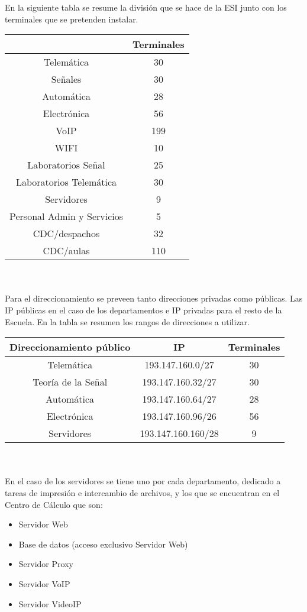 \documentclass[a4paper,10pt]{article}
\begin{document}
En la siguiente tabla se resume la división que se hace de la ESI junto con los terminales que se pretenden instalar.

\begin{tabular}{|c|c|}
\hline   & \textbf{Terminales} \\ 
\hline  Telemática & 30 \\ 
\hline  Señales & 30 \\ 
\hline  Automática & 28 \\ 
\hline  Electrónica & 56 \\ 
\hline  VoIP & 199 \\ 
\hline  WIFI & 10 \\ 
\hline  Laboratorios Señal & 25 \\ 
\hline  Laboratorios Telemática & 30 \\ 
\hline  Servidores & 9 \\ 
\hline  Personal Admin y Servicios & 5 \\ 
\hline  CDC/despachos & 32 \\ 
\hline  CDC/aulas & 110 \\ 
\hline 
\end{tabular} \\ \\
Para el direccionamiento se preveen tanto direcciones privadas como públicas. Las IP públicas en el caso de los departamentos e IP privadas para el resto de la Escuela. En la tabla se resumen los rangos de direcciones a utilizar.\\

\begin{tabular}{|c|c|c|}
\hline \textbf{Direccionamiento público} & IP & Terminales \\ 
\hline Telemática & 193.147.160.0/27 & 30 \\ 
\hline Teoría de la Señal & 193.147.160.32/27 & 30 \\ 
\hline Automática & 193.147.160.64/27 & 28 \\ 
\hline Electrónica & 193.147.160.96/26  & 56 \\ 
\hline Servidores & 193.147.160.160/28 & 9 \\ 
\hline 
\end{tabular} \\ \\

En el caso de los servidores se tiene uno por cada departamento, dedicado a tareas de impresión e intercambio de archivos, y los que se encuentran en el Centro de Cálculo que son:
\begin{itemize}
	\item Servidor Web
	\item Base de datos (acceso exclusivo Servidor Web)
	\item Servidor Proxy
	\item Servidor VoIP
	\item Servidor VideoIP
\end{itemize}
\end{document}
